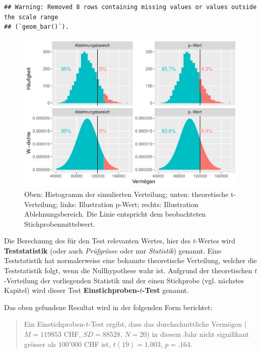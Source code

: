 \documentclass[
]{book}
\theoremstyle{definition}
\theoremstyle{definition}
\theoremstyle{definition}
\theoremstyle{definition}
\theoremstyle{remark}
\begin{document}
\begin{verbatim}
## Warning: Removed 8 rows containing missing values or values outside the scale range
## (`geom_bar()`).
\end{verbatim}

\begin{figure}
\centering
\includegraphics{aps_statistik1_files/figure-latex/exm-vermoegen-plots-sampling-theorie-1.pdf}
\caption{\label{fig:exm-vermoegen-plots-sampling-theorie}Oben: Histogramm der simulierten Verteilung; unten: theoretische t-Verteilung; links: Illustration p-Wert; rechts: Illustration Ablehnungsbereich. Die Linie entspricht dem beobachteten Stichprobenmittelwert.}
\end{figure}

\label{customdef-teststatistik}{Die Berechnung des für den Test relevanten Wertes, hier des \(t\)-Wertes wird \textbf{Teststatistik} (oder auch \emph{Prüfgrösse} oder nur \emph{Statistik}) genannt.} Eine Teststatistik hat normalerweise eine bekannte theoretische Verteilung, welcher die Teststatistik folgt, wenn die Nullhypothese wahr ist. \label{customdef-t-test}{Aufgrund der theoretischen \(t\)-Verteilung der vorliegenden Statistik und der einen Stichprobe (vgl. nächstes Kapitel) wird dieser Test \textbf{Einstichproben-\(t\)-Test} genannt.}

Das oben gefundene Resultat wird in der folgenden Form berichtet:

\begin{quote}
Ein Einstichproben-\(t\)-Test ergibt, dass das durchschnittliche Vermögen (\(M = 119853\) CHF, \(SD = 88528\), \(N = 20\)) in diesem Jahr nicht signifikant grösser als \(100'000\) CHF ist, \(t(19) = 1.003\), \(p = .164\).
\end{quote}
\end{document}
